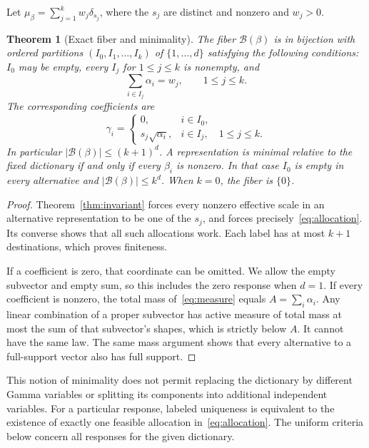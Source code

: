 \documentclass[11pt]{article}
\newtheorem{theorem}{Theorem}[section]
\theoremstyle{definition}\newtheorem{definition}[theorem]{Definition}
\theoremstyle{remark}\newtheorem{remark}[theorem]{Remark}
\newcommand{\B}{\mathcal B}
\begin{document}
Let $\mu_\beta=\sum_{j=1}^k w_j\delta_{s_j}$, where the $s_j$ are distinct and nonzero and $w_j>0$.

\begin{theorem}[Exact fiber and minimality]\label{thm:fiber}
The fiber $\B(\beta)$ is in bijection with ordered partitions $(I_0,I_1,\ldots,I_k)$ of $\{1,\ldots,d\}$ satisfying the following conditions: $I_0$ may be empty, every $I_j$ for $1\le j\le k$ is nonempty, and
\begin{equation}\label{eq:allocation}
 \sum_{i\in I_j}\alpha_i=w_j,\qquad 1\le j\le k.
\end{equation}
The corresponding coefficients are
\begin{equation}\label{eq:backmap}
 \gamma_i=\begin{cases}
 0,&i\in I_0,\\
 s_j\sqrt{\alpha_i},&i\in I_j,\quad 1\le j\le k.
 \end{cases}
\end{equation}
In particular $|\B(\beta)|\le(k+1)^d$. A representation is minimal relative to the fixed dictionary if and only if every $\beta_i$ is nonzero. In that case $I_0$ is empty in every alternative and $|\B(\beta)|\le k^d$. When $k=0$, the fiber is $\{0\}$.
\end{theorem}
\begin{proof}
Theorem~\ref{thm:invariant} forces every nonzero effective scale in an alternative representation to be one of the $s_j$, and forces precisely~\eqref{eq:allocation}. Its converse shows that all such allocations work. Each label has at most $k+1$ destinations, which proves finiteness.

If a coefficient is zero, that coordinate can be omitted. We allow the empty subvector and empty sum, so this includes the zero response when $d=1$. If every coefficient is nonzero, the total mass of~\eqref{eq:measure} equals $A=\sum_i\alpha_i$. Any linear combination of a proper subvector has active measure of total mass at most the sum of that subvector's shapes, which is strictly below $A$. It cannot have the same law. The same mass argument shows that every alternative to a full-support vector also has full support.
\end{proof}

This notion of minimality does not permit replacing the dictionary by different Gamma variables or splitting its components into additional independent variables. For a particular response, labeled uniqueness is equivalent to the existence of exactly one feasible allocation in~\eqref{eq:allocation}. The uniform criteria below concern all responses for the given dictionary.
\end{document}
